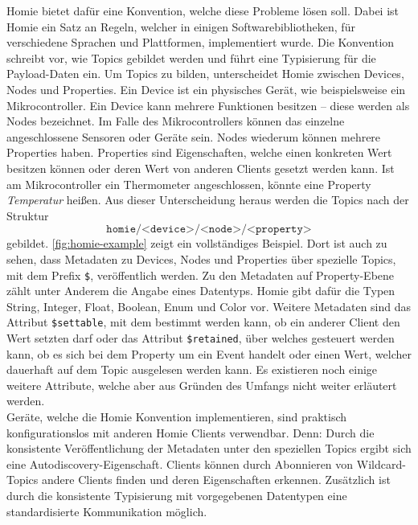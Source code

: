 Homie \cite{homie} bietet dafür eine Konvention, welche diese Probleme lösen soll. Dabei ist Homie
ein Satz an Regeln, welcher in einigen Softwarebibliotheken, für verschiedene
Sprachen und Plattformen, implementiert wurde. Die Konvention schreibt vor, wie Topics 
gebildet werden und führt eine Typisierung für die Payload-Daten ein.
Um Topics zu bilden, unterscheidet Homie zwischen Devices, Nodes und Properties. Ein Device
ist ein physisches Gerät, wie beispielsweise ein Mikrocontroller.
Ein Device kann mehrere Funktionen besitzen -- diese werden als Nodes
bezeichnet. Im Falle des Mikrocontrollers können das einzelne angeschlossene Sensoren
oder Geräte sein. Nodes wiederum können mehrere Properties haben. Properties sind Eigenschaften, welche 
einen konkreten Wert besitzen können oder deren Wert von anderen Clients gesetzt werden kann.
Ist am Mikrocontroller ein Thermometer angeschlossen, könnte eine Property \emph{Temperatur} heißen.
Aus dieser Unterscheidung heraus werden die Topics nach der Struktur
\[\texttt{homie/<device>/<node>/<property>} \]
gebildet. \autoref{fig:homie-example} zeigt ein vollständiges Beispiel. Dort ist auch zu sehen, dass 
Metadaten zu Devices, Nodes und Properties über spezielle Topics, mit dem Prefix \texttt{\$},
veröffentlich werden. Zu den Metadaten auf Property-Ebene zählt unter Anderem die Angabe eines
Datentyps. Homie gibt dafür die Typen String, Integer, Float, Boolean, Enum und Color vor.
Weitere Metadaten sind das Attribut \texttt{\$settable}, mit dem bestimmt werden kann,
ob ein anderer Client den Wert setzten darf oder das Attribut \texttt{\$retained}, über 
welches gesteuert werden kann, ob es sich bei dem Property um ein Event handelt oder einen Wert,
welcher dauerhaft auf dem Topic ausgelesen werden kann. Es existieren noch einige weitere Attribute,
welche aber aus Gründen des Umfangs nicht weiter erläutert werden.\\
Geräte, welche die Homie Konvention implementieren, sind praktisch konfigurationslos mit anderen
Homie Clients verwendbar. Denn: Durch die konsistente Veröffentlichung der Metadaten unter 
den speziellen Topics ergibt sich eine Autodiscovery-Eigenschaft. Clients können durch Abonnieren
von Wildcard-Topics andere Clients finden und deren Eigenschaften erkennen. Zusätzlich ist durch die
konsistente Typisierung mit vorgegebenen Datentypen eine standardisierte Kommunikation möglich. 

\iffalse
- Ein Design Prinzip ist Einfachheit (mqtt.github.io)
- MQTT ist ein sehr simples Protokoll
- Aufbau von Topics kann beliebig geschehen. MQTT gibt keine Struktur vor
- Payloads können jegliche Encodierung haben

- typisiert Daten
- Metadaten über spezielle Topics die mit \$ starten
- Autodiscovery

- Unterscheidet zwischen device node und property
- Beispiel von Webseite
\fi